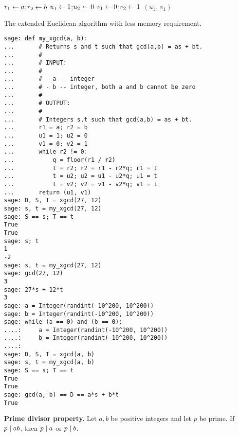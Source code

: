\begin{algorithm}[!htbp]
\dontprintsemicolon
\BlankLine
$r_1 \leftarrow a$;\quad $r_2 \leftarrow b$\;
$u_1 \leftarrow 1$;\quad $u_2 \leftarrow 0$\;
$v_1 \leftarrow 0$;\quad $v_2 \leftarrow 1$\;
\Return $(u_1,\, v_1)$
\caption{The extended Euclidean algorithm with less memory
  requirement.}
\label{alg:unique_factorization:extended_GCD_memory_efficient}
\end{algorithm}

\begin{lstlisting}
sage: def my_xgcd(a, b):
...       # Returns s and t such that gcd(a,b) = as + bt.
...       #
...       # INPUT:
...       #
...       # - a -- integer
...       # - b -- integer, both a and b cannot be zero
...       #
...       # OUTPUT:
...       #
...       # Integers s,t such that gcd(a,b) = as + bt.
...       r1 = a; r2 = b
...       u1 = 1; u2 = 0
...       v1 = 0; v2 = 1
...       while r2 != 0:
...           q = floor(r1 / r2)
...           t = r2; r2 = r1 - r2*q; r1 = t
...           t = u2; u2 = u1 - u2*q; u1 = t
...           t = v2; v2 = v1 - v2*q; v1 = t
...       return (u1, v1)
sage: D, S, T = xgcd(27, 12)
sage: s, t = my_xgcd(27, 12)
sage: S == s; T == t
True
True
sage: s; t
1
-2
sage: s, t = my_xgcd(27, 12)
sage: gcd(27, 12)
3
sage: 27*s + 12*t
3
sage: a = Integer(randint(-10^200, 10^200))
sage: b = Integer(randint(-10^200, 10^200))
sage: while (a == 0) and (b == 0):
....:     a = Integer(randint(-10^200, 10^200))
....:     b = Integer(randint(-10^200, 10^200))
....:
sage: D, S, T = xgcd(a, b)
sage: s, t = my_xgcd(a, b)
sage: S == s; T == t
True
True
sage: gcd(a, b) == D == a*s + b*t
True
\end{lstlisting}

\begin{corollary}
\label{cor:unique_factorization:prime_divisor_property}
\textbf{Prime divisor property.}
Let $a,b$ be positive integers and let $p$ be prime. If $p \;|\; ab$,
then $p \;|\; a$ or $p \;|\; b$.
\end{corollary}

